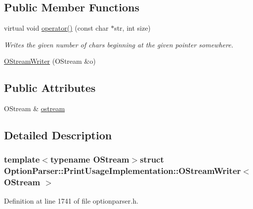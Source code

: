 \subsection*{Public Member Functions}
\begin{DoxyCompactItemize}
\item 
virtual void \hyperlink{struct_option_parser_1_1_print_usage_implementation_1_1_o_stream_writer_a4006320648ec0093dffbf19b474737e5}{operator()} (const char $\ast$str, int size)
\begin{DoxyCompactList}\small\item\em Writes the given number of chars beginning at the given pointer somewhere. \end{DoxyCompactList}\item 
\hyperlink{struct_option_parser_1_1_print_usage_implementation_1_1_o_stream_writer_a7d6cf26e6325c662a854c8744817c4e1}{O\-Stream\-Writer} (O\-Stream \&o)
\end{DoxyCompactItemize}
\subsection*{Public Attributes}
\begin{DoxyCompactItemize}
\item 
O\-Stream \& \hyperlink{struct_option_parser_1_1_print_usage_implementation_1_1_o_stream_writer_ad8d3bfece068e412d426221939259ace}{ostream}
\end{DoxyCompactItemize}


\subsection{Detailed Description}
\subsubsection*{template$<$typename O\-Stream$>$struct Option\-Parser\-::\-Print\-Usage\-Implementation\-::\-O\-Stream\-Writer$<$ O\-Stream $>$}



Definition at line 1741 of file optionparser.\-h.



